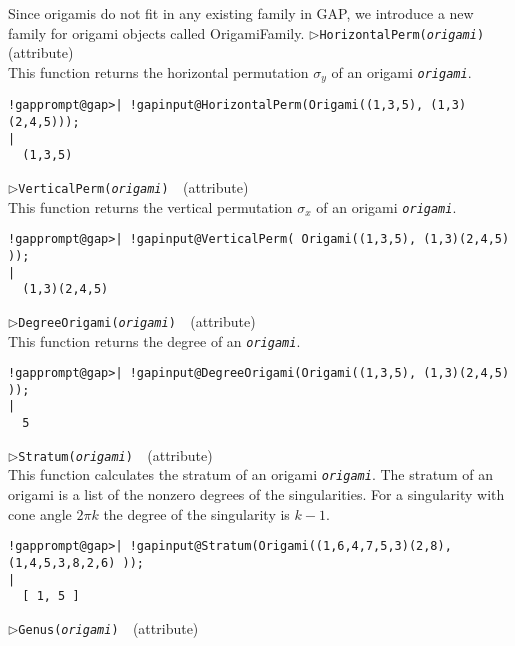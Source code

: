 \documentclass[a4paper,11pt]{report}
\begin{document}
{{{ Since origamis do not fit in any existing family in \textsf{GAP}, we introduce a new family for origami objects called OrigamiFamily. \noindent\textcolor{FuncColor}{$\triangleright$\enspace\texttt{HorizontalPerm({\mdseries\slshape origami})
\label{HorizontalPerm}
}\hfill{\scriptsize (attribute)}}\\


 This function returns the horizontal permutation $\sigma_y$ of an origami \mbox{\texttt{\mdseries\slshape origami}}. 
\begin{Verbatim}[commandchars=!@|,fontsize=\small,frame=single,label=Example]
  !gapprompt@gap>| !gapinput@HorizontalPerm(Origami((1,3,5), (1,3)(2,4,5)));
|
  (1,3,5)
\end{Verbatim}
 \noindent\textcolor{FuncColor}{$\triangleright$\enspace\texttt{VerticalPerm({\mdseries\slshape origami})
\label{VerticalPerm}
}\hfill{\scriptsize (attribute)}}\\


 This function returns the vertical permutation $\sigma_x$ of an origami \mbox{\texttt{\mdseries\slshape origami}}. 
\begin{Verbatim}[commandchars=!@|,fontsize=\small,frame=single,label=Example]
  !gapprompt@gap>| !gapinput@VerticalPerm( Origami((1,3,5), (1,3)(2,4,5) ));
|
  (1,3)(2,4,5)
\end{Verbatim}
 \noindent\textcolor{FuncColor}{$\triangleright$\enspace\texttt{DegreeOrigami({\mdseries\slshape origami})
\label{DegreeOrigami}
}\hfill{\scriptsize (attribute)}}\\


 This function returns the degree of an \mbox{\texttt{\mdseries\slshape origami}}. 
\begin{Verbatim}[commandchars=!@|,fontsize=\small,frame=single,label=Example]
  !gapprompt@gap>| !gapinput@DegreeOrigami(Origami((1,3,5), (1,3)(2,4,5) ));
|
  5
\end{Verbatim}
 \noindent\textcolor{FuncColor}{$\triangleright$\enspace\texttt{Stratum({\mdseries\slshape origami})
\label{Stratum}
}\hfill{\scriptsize (attribute)}}\\


 This function calculates the stratum of an origami \mbox{\texttt{\mdseries\slshape origami}}. The stratum of an origami is a list of the nonzero degrees of the
singularities. For a singularity with cone angle $2\pi k$ the degree of the singularity is $k-1$. 
\begin{Verbatim}[commandchars=!@|,fontsize=\small,frame=single,label=Example]
  !gapprompt@gap>| !gapinput@Stratum(Origami((1,6,4,7,5,3)(2,8), (1,4,5,3,8,2,6) ));
|
  [ 1, 5 ]
\end{Verbatim}
 \noindent\textcolor{FuncColor}{$\triangleright$\enspace\texttt{Genus({\mdseries\slshape origami})
\label{Genus}
}\hfill{\scriptsize (attribute)}}\\


}}}
\end{document}
